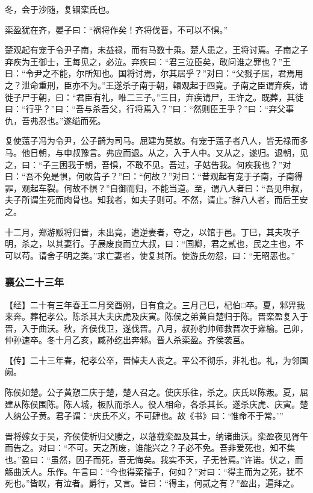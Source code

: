 \documentclass[]{article}
\begin{document}
冬，会于沙随，复锢栾氏也。

栾盈犹在齐，晏子曰：``祸将作矣！齐将伐晋，不可以不惧。''

楚观起有宠于令尹子南，未益禄，而有马数十乘。楚人患之，王将讨焉。子南之子弃疾为王御士，王每见之，必泣。弃疾曰：``君三泣臣矣，敢问谁之罪也？''王曰：``令尹之不能，尔所知也。国将讨焉，尔其居乎？''对曰：``父戮子居，君焉用之？泄命重刑，臣亦不为。''王遂杀子南于朝，轘观起于四竟。子南之臣谓弃疾，请徙子尸于朝，曰：``君臣有礼，唯二三子。''三日，弃疾请尸，王许之。既葬，其徒曰：``行乎？''曰：``吾与杀吾父，行将焉入？''曰：``然则臣王乎？''曰：``弃父事仇，吾弗忍也。''遂缢而死。

复使薳子冯为令尹，公子齮为司马。屈建为莫敖。有宠于薳子者八人，皆无禄而多马。他日朝，与申叔豫言。弗应而退。从之，入于人中。又从之，遂归。退朝，见之，曰：``子三困我于朝，吾惧，不敢不见。吾过，子姑告我。何疾我也？''对曰：``吾不免是惧，何敢告子？''曰：``何故？''对曰：``昔观起有宠于子南，子南得罪，观起车裂。何故不惧？''自御而归，不能当道。至，谓八人者曰：``吾见申叔，夫子所谓生死而肉骨也。知我者，如夫子则可。不然，请止。''辞八人者，而后王安之。

十二月，郑游贩将归晋，未出竟，遭逆妻者，夺之，以馆于邑。丁巳，其夫攻子明，杀之，以其妻行。子展废良而立大叔，曰：``国卿，君之贰也，民之主也，不可以苟。请舍子明之类。''求亡妻者，使复其所。使游氏勿怨，曰：``无昭恶也。''

\hypertarget{header-n2135}{%
\subsubsection{襄公二十三年}\label{header-n2135}}

【经】二十有三年春王二月癸酉朔，日有食之。三月己巳，杞伯□卒。夏，邾畀我来奔。葬杞孝公。陈杀其大夫庆虎及庆寅。陈侯之弟黄自楚归于陈。晋栾盈复入于晋，入于曲沃。秋，齐侯伐卫，遂伐晋。八月，叔孙豹帅师救晋次于雍榆。己卯，仲孙速卒。冬十月乙亥，臧孙纥出奔邾。晋人杀栾盈。齐侯袭莒。

【传】二十三年春，杞孝公卒，晋悼夫人丧之。平公不彻乐，非礼也。礼，为邻国阙。

陈侯如楚。公子黄愬二庆于楚，楚人召之。使庆乐往，杀之。庆氏以陈叛。夏，屈建从陈侯围陈。陈人城，板队而杀人。役人相命，各杀其长。遂杀庆虎、庆寅。楚人纳公子黄。君子谓：``庆氏不义，不可肆也。故《书》曰：`惟命不于常。'''

晋将嫁女于吴，齐侯使析归父媵之，以藩载栾盈及其士，纳诸曲沃。栾盈夜见胥午而告之。对曰：``不可。天之所废，谁能兴之？子必不免。吾非爱死也，知不集也。''盈曰：``虽然，因子而死，吾无悔矣。我实不天，子无咎焉。''许诺。伏之，而觞曲沃人。乐作。午言曰：``今也得栾孺子，何如？''对曰：``得主而为之死，犹不死也。''皆叹，有泣者。爵行，又言。皆曰：``得主，何贰之有？''盈出，遍拜之。
\end{document}
